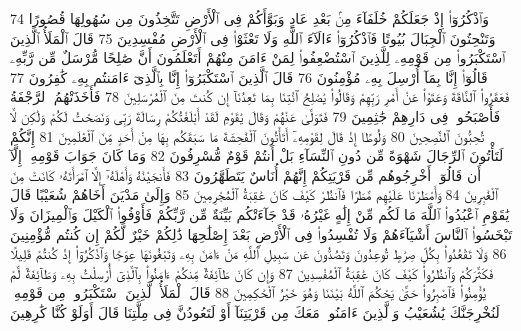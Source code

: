{\tiny\colorbox{cl_aya}{74}} وَٱذْكُرُوٓا۟ إِذْ جَعَلَكُمْ خُلَفَآءَ مِنۢ بَعْدِ عَادٍ وَبَوَّأَكُمْ فِى ٱلْأَرْضِ تَتَّخِذُونَ مِن سُهُولِهَا قُصُورًا وَتَنْحِتُونَ ٱلْجِبَالَ بُيُوتًا فَٱذْكُرُوٓا۟ ءَالَآءَ ٱللَّهِ وَلَا تَعْثَوْا۟ فِى ٱلْأَرْضِ مُفْسِدِينَ
{\tiny\colorbox{cl_aya}{75}} قَالَ ٱلْمَلَأُ ٱلَّذِينَ ٱسْتَكْبَرُوا۟ مِن قَوْمِهِۦ لِلَّذِينَ ٱسْتُضْعِفُوا۟ لِمَنْ ءَامَنَ مِنْهُمْ أَتَعْلَمُونَ أَنَّ صَٰلِحًا مُّرْسَلٌ مِّن رَّبِّهِۦ قَالُوٓا۟ إِنَّا بِمَآ أُرْسِلَ بِهِۦ مُؤْمِنُونَ
{\tiny\colorbox{cl_aya}{76}} قَالَ ٱلَّذِينَ ٱسْتَكْبَرُوٓا۟ إِنَّا بِٱلَّذِىٓ ءَامَنتُم بِهِۦ كَٰفِرُونَ
{\tiny\colorbox{cl_aya}{77}} فَعَقَرُوا۟ ٱلنَّاقَةَ وَعَتَوْا۟ عَنْ أَمْرِ رَبِّهِمْ وَقَالُوا۟ يَٰصَٰلِحُ ٱئْتِنَا بِمَا تَعِدُنَآ إِن كُنتَ مِنَ ٱلْمُرْسَلِينَ
{\tiny\colorbox{cl_aya}{78}} فَأَخَذَتْهُمُ ٱلرَّجْفَةُ فَأَصْبَحُوا۟ فِى دَارِهِمْ جَٰثِمِينَ
{\tiny\colorbox{cl_aya}{79}} فَتَوَلَّىٰ عَنْهُمْ وَقَالَ يَٰقَوْمِ لَقَدْ أَبْلَغْتُكُمْ رِسَالَةَ رَبِّى وَنَصَحْتُ لَكُمْ وَلَٰكِن لَّا تُحِبُّونَ ٱلنَّٰصِحِينَ
{\tiny\colorbox{cl_aya}{80}} وَلُوطًا إِذْ قَالَ لِقَوْمِهِۦٓ أَتَأْتُونَ ٱلْفَٰحِشَةَ مَا سَبَقَكُم بِهَا مِنْ أَحَدٍ مِّنَ ٱلْعَٰلَمِينَ
{\tiny\colorbox{cl_aya}{81}} إِنَّكُمْ لَتَأْتُونَ ٱلرِّجَالَ شَهْوَةً مِّن دُونِ ٱلنِّسَآءِ بَلْ أَنتُمْ قَوْمٌ مُّسْرِفُونَ
{\tiny\colorbox{cl_aya}{82}} وَمَا كَانَ جَوَابَ قَوْمِهِۦٓ إِلَّآ أَن قَالُوٓا۟ أَخْرِجُوهُم مِّن قَرْيَتِكُمْ إِنَّهُمْ أُنَاسٌ يَتَطَهَّرُونَ
{\tiny\colorbox{cl_aya}{83}} فَأَنجَيْنَٰهُ وَأَهْلَهُۥٓ إِلَّا ٱمْرَأَتَهُۥ كَانَتْ مِنَ ٱلْغَٰبِرِينَ
{\tiny\colorbox{cl_aya}{84}} وَأَمْطَرْنَا عَلَيْهِم مَّطَرًا فَٱنظُرْ كَيْفَ كَانَ عَٰقِبَةُ ٱلْمُجْرِمِينَ
{\tiny\colorbox{cl_aya}{85}} وَإِلَىٰ مَدْيَنَ أَخَاهُمْ شُعَيْبًا قَالَ يَٰقَوْمِ ٱعْبُدُوا۟ ٱللَّهَ مَا لَكُم مِّنْ إِلَٰهٍ غَيْرُهُۥ قَدْ جَآءَتْكُم بَيِّنَةٌ مِّن رَّبِّكُمْ فَأَوْفُوا۟ ٱلْكَيْلَ وَٱلْمِيزَانَ وَلَا تَبْخَسُوا۟ ٱلنَّاسَ أَشْيَآءَهُمْ وَلَا تُفْسِدُوا۟ فِى ٱلْأَرْضِ بَعْدَ إِصْلَٰحِهَا ذَٰلِكُمْ خَيْرٌ لَّكُمْ إِن كُنتُم مُّؤْمِنِينَ
{\tiny\colorbox{cl_aya}{86}} وَلَا تَقْعُدُوا۟ بِكُلِّ صِرَٰطٍ تُوعِدُونَ وَتَصُدُّونَ عَن سَبِيلِ ٱللَّهِ مَنْ ءَامَنَ بِهِۦ وَتَبْغُونَهَا عِوَجًا وَٱذْكُرُوٓا۟ إِذْ كُنتُمْ قَلِيلًا فَكَثَّرَكُمْ وَٱنظُرُوا۟ كَيْفَ كَانَ عَٰقِبَةُ ٱلْمُفْسِدِينَ
{\tiny\colorbox{cl_aya}{87}} وَإِن كَانَ طَآئِفَةٌ مِّنكُمْ ءَامَنُوا۟ بِٱلَّذِىٓ أُرْسِلْتُ بِهِۦ وَطَآئِفَةٌ لَّمْ يُؤْمِنُوا۟ فَٱصْبِرُوا۟ حَتَّىٰ يَحْكُمَ ٱللَّهُ بَيْنَنَا وَهُوَ خَيْرُ ٱلْحَٰكِمِينَ
{\tiny\colorbox{cl_aya}{88}} قَالَ ٱلْمَلَأُ ٱلَّذِينَ ٱسْتَكْبَرُوا۟ مِن قَوْمِهِۦ لَنُخْرِجَنَّكَ يَٰشُعَيْبُ وَٱلَّذِينَ ءَامَنُوا۟ مَعَكَ مِن قَرْيَتِنَآ أَوْ لَتَعُودُنَّ فِى مِلَّتِنَا قَالَ أَوَلَوْ كُنَّا كَٰرِهِينَ
